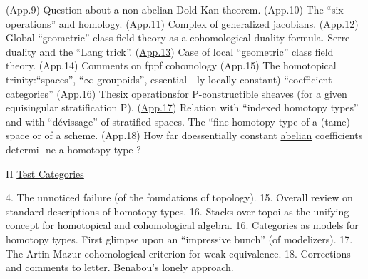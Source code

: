 (App.9)  Question about a non-abelian Dold-Kan theorem.
(App.10) The ``six operations'' and homology.
(\uline{App.11}) Complex of generalized jacobians.
(\uline{App.12}) Global ``geometric'' class field theory as a cohomological
duality formula. Serre duality and the ``Lang trick''.
(\uline{App.13}) Case of local ``geometric'' class field theory.
(App.14) Comments on fppf cohomology   
(App.15) The homotopical trinity:\unsure{\deleted{\hand{(}}}``spaces'', ``$\infty$-groupoids'', \hand{(}essential-%
-ly locally constant) ``coefficient categories''
(App.16) Thesix operationsfor P-constructible sheaves (for a given
equisingular stratification P).
(\uline{App.17}) Relation with ``indexed homotopy types'' and with ``dévissage''
of stratified spaces. The ``fine homotopy type of a (tame)
space or of a scheme.
(App.18) How far doessentially constant \uline{abelian} coefficients determi-%
ne a homotopy type ?

II \uline{Test Categories}

4. The unnoticed failure (of the foundations of topology).
15. Overall review on standard descriptions of homotopy types.
16. Stacks over topoi as the unifying concept for homotopical and
cohomological algebra.
16. Categories as models for homotopy types. First glimpse upon an
``impressive bunch'' (of modelizers).
17. The Artin-Mazur cohomological criterion for weak equivalence.
18. Corrections and comments to letter. Benabou's lonely approach.

